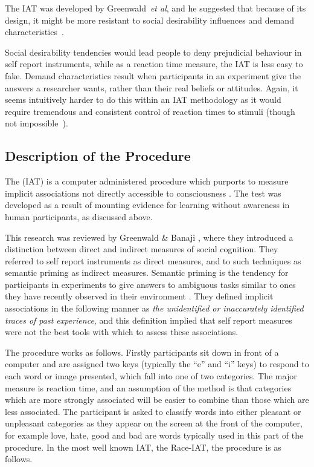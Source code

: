 The IAT was developed by Greenwald~\textit{et al}, and he suggested that because of its design, it might be more resistant to social desirability influences and demand characteristics~\cite{Greenwald1998}. 

Social desirability tendencies would lead people to deny prejudicial behaviour in self report instruments, while as a reaction time measure, the IAT is less easy to fake. Demand characteristics result when participants in an experiment give the answers a researcher wants, rather than their real beliefs or attitudes. Again, it seems intuitively harder to do this within an IAT methodology as it would require tremendous and consistent control of reaction times to stimuli (though not impossible~\cite{DeHouwer2007b}). 

\subsection{Description of the Procedure}
\label{sec:descr-proc}

The (IAT) is a computer administered procedure which purports to measure implicit associations not directly accessible to consciousness \cite{Greenwald1998}. The test was developed as a result of mounting evidence for learning without awareness in human participants, as discussed above. 

This research was reviewed by Greenwald \& Banaji \cite{Greenwald1995a}, where they introduced a distinction between direct and indirect measures of social cognition. They referred to self report instruments as direct measures, and to such techniques as semantic priming as indirect measures. Semantic priming is the tendency for participants in experiments to give answers to ambiguous tasks similar to ones they have recently observed in their environment \cite{Wittenbrink2007}.  They defined implicit associations in the following manner as \textit{the unidentified or inaccurately identified traces of past experience}, and this definition implied that self report measures were not the best tools with which to assess these associations. 

The procedure works as follows. Firstly participants sit down in front of a computer and are assigned two keys (typically the ``e'' and ``i'' keys) to respond to each word or image presented, which fall into one of two categories. The major measure is reaction time, and an assumption of the method is that categories which are more strongly associated will be easier to combine than those which are less associated.  The participant is asked to classify words into either pleasant or unpleasant categories as they appear on the screen at the front of the computer, for example love, hate, good  and bad are words typically used in this part of the procedure. In the most well known IAT, the Race-IAT, the procedure is as follows. 

